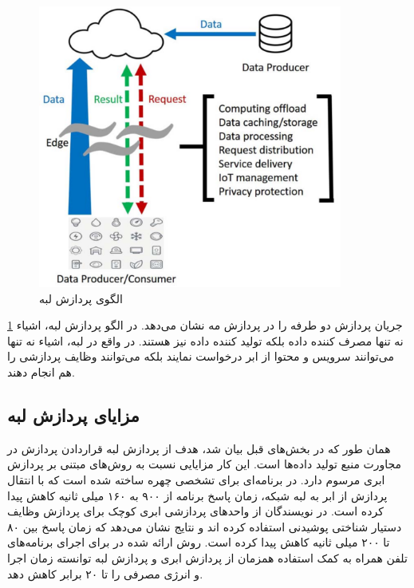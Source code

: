       \begin{figure}[h]
        \centerline{\includegraphics[width=10cm]{graphics/chapter_2/edge_paradigm}}
        \caption{الگوی پردازش لبه \cite{shi2016edge}}
        \label{fig:chapter_2:edge_paradigm}
      \end{figure}
      
      \cref{fig:chapter_2:edge_paradigm} جریان پردازش دو طرفه را در پردازش مه نشان می‌دهد.
      در الگو پردازش لبه، اشیاء نه تنها مصرف کننده داده بلکه تولید کننده‌ داده نیز هستند.
      در واقع در لبه، اشیاء نه تنها می‌توانند سرویس و محتوا از ابر درخواست نمایند بلکه می‌توانند وظایف پردازشی را هم انجام دهند.

    \subsection{مزایای پردازش لبه}
      همان طور که در بخش‌های قبل بیان شد، هدف از پردازش لبه قراردادن پردازش در مجاورت منبع تولید داده‌ها است.
      این کار مزایایی نسبت به روش‌های مبتنی بر پردازش ابری مرسوم دارد.
      در \cite{yi2015fog} برنامه‌ای برای تشخصی چهره ساخته شده است که با انتقال پردازش از ابر به لبه شبکه، زمان پاسخ برنامه از ۹۰۰ به ۱۶۰ میلی ثانیه کاهش پیدا کرده است.
      در \cite{ha2014towards} نویسندگان از واحدهای پردازشی ابری کوچک برای پردازش وظایف دستیار شناختی پوشیدنی استفاده کرده اند و نتایج نشان می‌دهد که زمان پاسخ بین ۸۰ تا ۲۰۰ میلی ثانیه کاهش پیدا کرده است.
      روش ارائه شده در \cite{chun2011clonecloud} برای اجرای برنامه‌های تلفن همراه به کمک استفاده همزمان از پردازش ابری و پردازش لبه توانسته زمان اجرا و انرژی مصرفی را تا ۲۰ برابر کاهش دهد.

